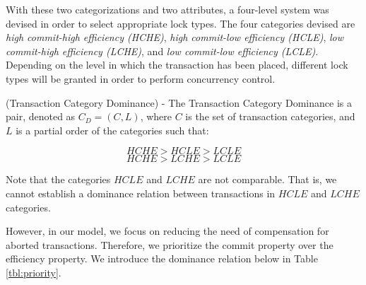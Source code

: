 \begin{definition}
{With these two categorizations and two attributes, a four-level system was devised in order to select appropriate lock types. The four categories devised are \textit{high commit-high efficiency (\ac{HCHE})}, \textit{high commit-low efficiency (\ac{HCLE})}, \textit{low commit-high efficiency (\ac{LCHE})}, and \textit{low commit-low efficiency (\ac{LCLE})}. Depending on the level in which the transaction has been placed, different lock types will be granted in order to perform concurrency control.}

\end{definition}

\begin{definition}
\label{cat_dominance}
(Transaction Category Dominance) - The Transaction Category Dominance is a pair, denoted as $C_{D} = (C,L)$, where $C$ is the set of transaction categories, and $L$ is a partial order of the categories such that:
 
\[\textrm{$HCHE > HCLE > LCLE$}\]
\[\textrm{$HCHE > LCHE > LCLE$} \]

\begin{figure}[h]
\captionsetup{justification=centering}
\centering %


\label{fig:category_lattice} %

\end{figure}

{\normalfont Note that the categories $HCLE$ and $LCHE$ are not comparable. That is, we cannot establish a dominance relation between transactions in $HCLE$ and $LCHE$ categories.

However, in our model, we focus on reducing the need of compensation for aborted transactions. Therefore, we prioritize the commit property over the efficiency property. We introduce the dominance relation below in Table \ref{tbl:priority}.}


\end{definition}
